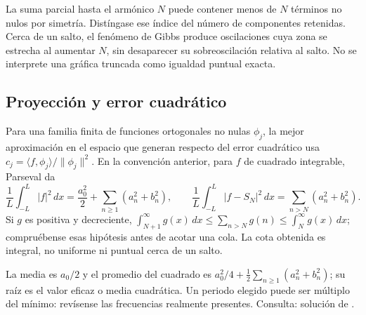 La suma parcial hasta el armónico $N$ puede contener menos de $N$ términos
no nulos por simetría. Distíngase ese índice del número de componentes
retenidas. Cerca de un salto, el fenómeno de Gibbs produce oscilaciones
cuya zona se estrecha al aumentar $N$, sin desaparecer su sobreoscilación
relativa al salto. No se interprete una gráfica truncada como igualdad
puntual exacta.

%
\subsection*{Proyección y error cuadrático}
\label{CH08-B04}
Para una familia finita de funciones ortogonales no nulas $\phi_j$, la
mejor aproximación en el espacio que generan
respecto del error cuadrático usa
$c_j=\langle f,\phi_j\rangle/\|\phi_j\|^2$. En la convención anterior,
para $f$ de cuadrado integrable, Parseval da
\[
 \frac1L\int_{-L}^{L}|f|^2\,dx
 =\frac{a_0^2}{2}+\sum_{n\ge1}(a_n^2+b_n^2),\qquad
 \frac1L\int_{-L}^{L}|f-S_N|^2\,dx
 =\sum_{n>N}(a_n^2+b_n^2).
\]
Si $g$ es positiva y decreciente,
$\int_{N+1}^{\infty}g(x)\,dx\le\sum_{n>N}g(n)
\le\int_N^{\infty}g(x)\,dx$; compruébense esas hipótesis antes de
acotar una cola. La cota obtenida es integral, no uniforme ni puntual
cerca de un salto.

La media es $a_0/2$ y el promedio del cuadrado es
$a_0^2/4+\frac12\sum_{n\ge1}(a_n^2+b_n^2)$; su raíz es el valor
eficaz o media cuadrática. Un periodo elegido puede ser múltiplo del mínimo: revísense las
frecuencias realmente presentes. Consulta: solución de .
